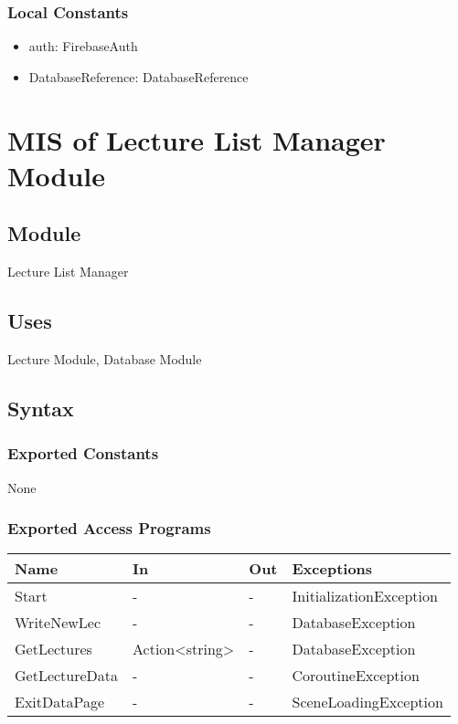 \documentclass[12pt, titlepage]{article}
\begin{document}
\subsubsection{Local Constants}

\begin{itemize}
  \item auth: FirebaseAuth
  \item DatabaseReference: DatabaseReference
\end{itemize}

\newpage

\section{MIS of Lecture List Manager Module} \label{mLL}

\subsection{Module}

Lecture List Manager

\subsection{Uses}

Lecture Module, Database Module

\subsection{Syntax}

\subsubsection{Exported Constants}
None

\subsubsection{Exported Access Programs}
\begin{center}
\begin{tabular}{p{4cm} p{2cm} p{4cm} p{4cm}}
\hline
\textbf{Name} & \textbf{In} & \textbf{Out} & \textbf{Exceptions} \\
\hline
Start & - & - & InitializationException \\
WriteNewLec & - & - & DatabaseException \\
GetLectures & Action<string> & - & DatabaseException \\
GetLectureData & - & - & CoroutineException \\
ExitDataPage & - & - & SceneLoadingException \\
\hline
\end{tabular}
\end{center}
\end{document}
